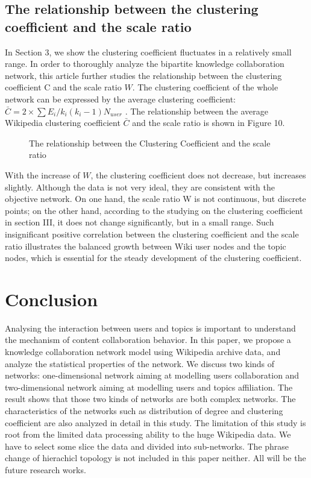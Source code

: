 \documentclass{elsarticle}
\begin{document}
\subsection{ The relationship between the clustering coefficient and the scale ratio}
\label{sec:relat-betw-clust}
 In Section 3, we show the clustering coefficient fluctuates in a
relatively small range.  In order to thoroughly
analyze the bipartite knowledge collaboration network, this article
further studies the relationship between the clustering coefficient C
and the scale ratio $W$. The clustering coefficient of the whole
network can be expressed by the average clustering coefficient:
$\bar{C}=2\times \sum E_i/k_i(k_i-1)N_{user}$ . The
relationship between the average Wikipedia clustering coefficient
$\bar{C}$ and the scale ratio is shown in Figure 10. 
\begin{figure}[htpb]
  \centering
  \scalebox{0.3}{\texttt{[image: 10]}}
  \caption{The relationship between the  Clustering Coefficient  and the scale ratio}
\end{figure}

With the increase of $W$, the clustering coefficient does not decrease, but increases slightly. Although the data is not very ideal, they are consistent with the objective network. On one hand, the scale ratio W is not continuous, but discrete points; on the other hand, according to the studying on the clustering coefficient in section III, it does not change significantly, but in a small range. Such insignificant positive correlation between the clustering coefficient and the scale ratio illustrates the balanced growth between Wiki user nodes and the topic nodes, which is essential for the steady development of the clustering coefficient. 


\section{Conclusion}
\label{sec:5concl-disc-}

Analysing the interaction between users and topics is important to
understand the mechanism of content collaboration behavior. 
In this paper, we propose a knowledge collaboration network model
using  Wikipedia archive data, and analyze the statistical
properties of the network. We discuss two kinds of networks:
one-dimensional network aiming at modelling users collaboration and
two-dimensional network aiming at modelling users and topics
affiliation. The result shows that those two kinds of networks are
both complex networks. The characteristics of the networks such as
distribution of degree and clustering coefficient are also analyzed in
detail in this study. The limitation of this study is root from the
limited data processing ability to the
huge Wikipedia data. We have to select some slice the data and divided
into sub-networks. The
phrase change of hierachicl topology is  not included in this paper
neither. All will be the future research works.  
\end{document}
